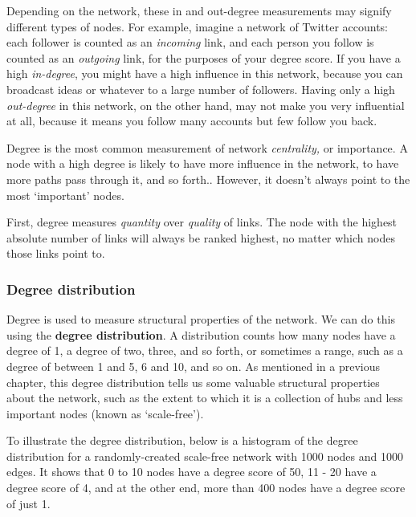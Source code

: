 \documentclass[
]{book}
\begin{document}
Depending on the network, these in and out-degree measurements may signify different types of nodes. For example, imagine a network of Twitter accounts: each follower is counted as an \emph{incoming} link, and each person you follow is counted as an \emph{outgoing} link, for the purposes of your degree score. If you have a high \emph{in-degree}, you might have a high influence in this network, because you can broadcast ideas or whatever to a large number of followers. Having only a high \emph{out-degree} in this network, on the other hand, may not make you very influential at all, because it means you follow many accounts but few follow you back.

Degree is the most common measurement of network \emph{centrality,} or importance. A node with a high degree is likely to have more influence in the network, to have more paths pass through it, and so forth.. However, it doesn't always point to the most `important' nodes.

First, degree measures \emph{quantity} over \emph{quality} of links. The node with the highest absolute number of links will always be ranked highest, no matter which nodes those links point to.

\hypertarget{degree-distribution}{%
\subsubsection{Degree distribution}\label{degree-distribution}}

Degree is used to measure structural properties of the network. We can do this using the \textbf{degree distribution}. A distribution counts how many nodes have a degree of 1, a degree of two, three, and so forth, or sometimes a range, such as a degree of between 1 and 5, 6 and 10, and so on. As mentioned in a previous chapter, this degree distribution tells us some valuable structural properties about the network, such as the extent to which it is a collection of hubs and less important nodes (known as `scale-free').

To illustrate the degree distribution, below is a histogram of the degree distribution for a randomly-created scale-free network with 1000 nodes and 1000 edges. It shows that 0 to 10 nodes have a degree score of 50, 11 - 20 have a degree score of 4, and at the other end, more than 400 nodes have a degree score of just 1.
\end{document}

